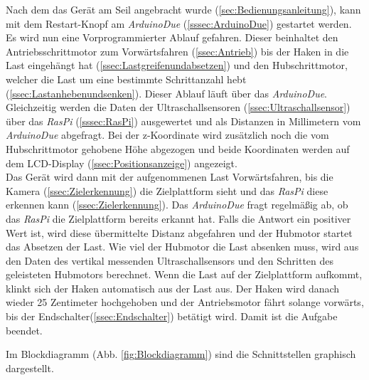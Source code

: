 \documentclass[a4paper]{report}
\begin{document}
Nach dem das Gerät am Seil angebracht wurde (\ref{sec:Bedienungsanleitung}), kann mit dem Restart-Knopf am \textit{ArduinoDue} (\ref{sssec:ArduinoDue}) gestartet werden. Es wird nun eine Vorprogrammierter Ablauf gefahren. Dieser beinhaltet den Antriebsschrittmotor zum Vorwärtsfahren (\ref{ssec:Antrieb}) bis der Haken in die Last eingehängt hat (\ref{ssec:Lastgreifenundabsetzen}) und den Hubschrittmotor, welcher die Last um eine bestimmte Schrittanzahl hebt (\ref{ssec:Lastanhebenundsenken}). Dieser Ablauf läuft über das \textit{ArduinoDue}. Gleichzeitig werden die Daten der Ultraschallsensoren (\ref{ssec:Ultraschallsensor}) über das \textit{RasPi} (\ref{sssec:RasPi}) ausgewertet und als Distanzen in Millimetern vom \textit{ArduinoDue} abgefragt. Bei der z-Koordinate wird zusätzlich noch die vom Hubschrittmotor gehobene Höhe abgezogen und beide Koordinaten werden auf dem LCD-Display (\ref{ssec:Positionsanzeige}) angezeigt.\\
Das Gerät wird dann mit der aufgenommenen Last Vorwärtsfahren, bis die Kamera (\ref{ssec:Zielerkennung}) die Zielplattform sieht und das \textit{RasPi} diese erkennen kann (\ref{ssec:Zielerkennung}). Das \textit{ArduinoDue} fragt regelmäßig ab, ob das \textit{RasPi} die Zielplattform bereits erkannt hat. Falls die Antwort ein positiver Wert ist, wird diese übermittelte Distanz abgefahren und der Hubmotor startet das Absetzen der Last. Wie viel der Hubmotor die Last absenken muss, wird aus den Daten des vertikal messenden Ultraschallsensors und den Schritten des geleisteten Hubmotors berechnet. Wenn die Last auf der Zielplattform aufkommt, klinkt sich der Haken automatisch aus der Last aus. Der Haken wird danach wieder 25 Zentimeter hochgehoben und der Antriebsmotor fährt solange vorwärts, bis der Endschalter(\ref{ssec:Endschalter}) betätigt wird. Damit ist die Aufgabe beendet.


\newpage
Im Blockdiagramm (Abb. \ref{fig:Blockdiagramm}) sind die Schnittstellen graphisch dargestellt.
\end{document}
